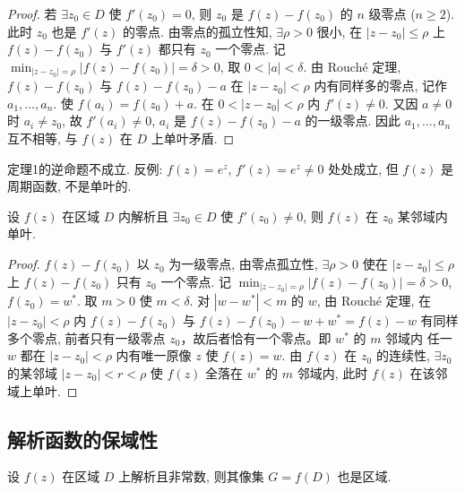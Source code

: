 \documentclass[theorem=false,mathfont=none,openany,sub3section]{easybook}
\begin{document}
\begin{proof}
  若 $\exists z_{0}\in D$ 使 $f'(z_{0})=0$, 则 $z_{0}$ 是 $f(z)-f(z_{0})$ 的 $n$ 级零点 ($n\geq2$). 此时 $z_{0}$ 也是 $f'(z)$ 的零点. 由零点的孤立性知,
  $\exists\rho>0$ 很小, 在 $|z-z_{0}|\leq\rho$ 上 $f(z)-f(z_{0})$ 与 $f'(z)$ 都只有 $z_{0}$ 一个零点.
  记 $\displaystyle\min_{|z-z_{0}|=\rho}|f(z)-f(z_{0})|=\delta>0$, 取 $0<|a|<\delta$.
  由 Rouch\'{e} 定理, $f(z)-f(z_{0})$ 与 $f(z)-f(z_{0})-a$ 在 $|z-z_{0}|<\rho$ 内有同样多的零点, 记作 $a_{1},\ldots,a_{n}$. 使 $f(a_{i})=f(z_{0})+a$.
  在 $0<|z-z_{0}|<\rho$ 内 $f'(z)\neq0$. 又因 $a\neq0$ 时 $a_i\neq z_0$, 故 $f'(a_{i})\neq0$,
  $a_{i}$ 是 $f(z)-f(z_{0})-a$ 的一级零点. 因此 $a_{1},\ldots,a_{n}$ 互不相等,
  与 $f(z)$ 在 $D$ 上单叶矛盾.
\end{proof}

\begin{remark}
  定理1的逆命题不成立. 反例: $f(z)=e^{z}$, $f'(z)=e^{z}\neq0$ 处处成立, 但 $f(z)$ 是周期函数, 不是单叶的.
\end{remark}

\begin{theorem}
  设 $f(z)$ 在区域 $D$ 内解析且 $\exists z_{0}\in D$ 使 $f'(z_{0})\neq0$, 则 $f(z)$ 在 $z_{0}$ 某邻域内单叶.
\end{theorem}

\begin{proof}
  $f(z)-f(z_{0})$ 以 $z_{0}$ 为一级零点, 由零点孤立性, $\exists\rho>0$ 使在 $|z-z_{0}|\leq\rho$ 上 $f(z)-f(z_{0})$ 只有 $z_{0}$ 一个零点.
  记 $\displaystyle\min_{|z-z_{0}|=\rho}|f(z)-f(z_{0})|=\delta>0$, $f(z_{0})=w^{*}$. 取 $m>0$ 使 $m<\delta$.
  对 $|w-w^{*}|<m$ 的 $w$, 由 Rouch\'{e} 定理, 在 $|z-z_{0}|<\rho$ 内 $f(z)-f(z_{0})$ 与 $f(z)-f(z_{0})-w+w^{*}=f(z)-w$ 有同样多个零点,
  前者只有一级零点 $z_0$，故后者恰有一个零点。即 $w^{*}$ 的 $m$ 邻域内
  任一 $w$ 都在 $|z-z_{0}|<\rho$ 内有唯一原像 $z$ 使 $f(z)=w$.
  由 $f(z)$ 在 $z_{0}$ 的连续性, $\exists z_{0}$ 的某邻域 $|z-z_{0}|<r<\rho$ 使 $f(z)$ 全落在 $w^{*}$ 的 $m$ 邻域内, 此时 $f(z)$ 在该邻域上单叶.
\end{proof}

\subsection{解析函数的保域性}

\begin{theorem}[保域性定理]
  设 $f(z)$ 在区域 $D$ 上解析且非常数, 则其像集 $G=f(D)$ 也是区域.
\end{theorem}
\end{document}
